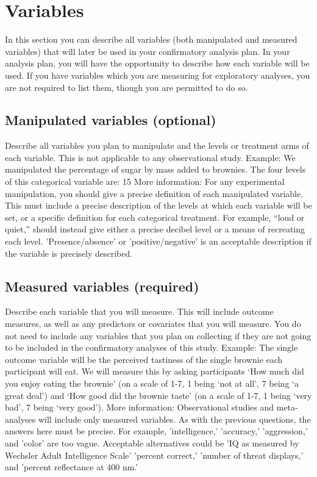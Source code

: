 \documentclass[
10pt, %
a4paper, %
oneside, %
headinclude,footinclude, %
BCOR5mm, %
]{scrartcl}
\begin{document}
\section{Variables}

In this section you can describe all variables (both manipulated and measured variables) that will later be used in your confirmatory analysis plan. In your analysis plan, you will have the opportunity to describe how each variable will be used. If you have variables which you are measuring for exploratory analyses, you are not required to list them, though you are permitted to do so.

\subsection{Manipulated variables (optional)}
Describe all variables you plan to manipulate and the levels or treatment arms of each variable. This is not applicable to any observational study. 
Example: We manipulated the percentage of sugar by mass added to brownies. The four levels of this categorical variable are: 15%
More information: For any experimental manipulation, you should give a precise definition of each manipulated variable. This must include a precise description of the levels at which each variable will be set, or a specific definition for each categorical treatment. For example, “loud or quiet,” should instead give either a precise decibel level or a means of recreating each level. 'Presence/absence' or 'positive/negative' is an acceptable description if the variable is precisely described.


\subsection{Measured variables (required)}
Describe each variable that you will measure. This will include outcome measures, as well as any predictors or covariates that you will measure. You do not need to include any variables that you plan on collecting if they are not going to be included in the confirmatory analyses of this study.
Example: The single outcome variable will be the perceived tastiness of the single brownie each participant will eat. We will measure this by asking participants ‘How much did you enjoy eating the brownie’ (on a scale of 1-7, 1 being ‘not at all’, 7 being ‘a great deal’) and ‘How good did the brownie taste’ (on a scale of 1-7, 1 being ‘very bad’, 7 being ‘very good’). 
More information: Observational studies and meta-analyses will include only measured variables. As with the previous questions, the answers here must be precise. For example, 'intelligence,' 'accuracy,' 'aggression,' and 'color' are too vague. Acceptable alternatives could be 'IQ as measured by Wechsler Adult Intelligence Scale' 'percent correct,' 'number of threat displays,' and 'percent reflectance at 400 nm.'
\end{document}
